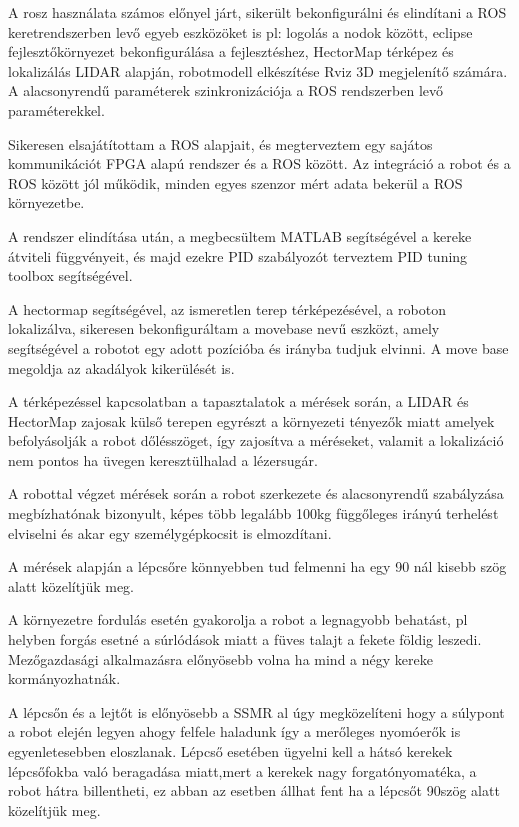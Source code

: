 A rosz használata számos előnyel járt, sikerült bekonfigurálni és elindítani a ROS keretrendszerben levő egyeb eszközöket is pl: logolás a nodok között, eclipse fejlesztőkörnyezet bekonfigurálása a fejlesztéshez, HectorMap térképez és lokalizálás LIDAR alapján, robotmodell elkészítése Rviz 3D megjelenítő számára. A alacsonyrendű paraméterek szinkronizációja a ROS rendszerben levő paraméterekkel.

Sikeresen elsajátítottam a ROS alapjait, és megterveztem egy sajátos kommunikációt FPGA alapú rendszer és a ROS között. Az integráció a robot és a ROS között jól működik, minden egyes szenzor mért adata bekerül a ROS környezetbe.

A rendszer elindítása után, a megbecsültem MATLAB segítségével a kereke átviteli függvényeit, és majd ezekre PID szabályozót terveztem PID tuning toolbox segítségével.

A hectormap segítségével, az ismeretlen terep térképezésével, a roboton lokalizálva, sikeresen bekonfiguráltam a movebase nevű eszközt, amely segítségével a robotot egy adott pozícióba és irányba tudjuk elvinni. A move base megoldja az akadályok kikerülését is.

A térképezéssel kapcsolatban a tapasztalatok a mérések során, a LIDAR és HectorMap zajosak külső terepen egyrészt a környezeti tényezők miatt amelyek befolyásolják a robot dőlésszöget, így zajosítva a méréseket, valamit a lokalizáció nem pontos ha üvegen keresztülhalad a lézersugár.

A robottal végzet mérések során a robot szerkezete és alacsonyrendű szabályzása megbízhatónak bizonyult, képes több legalább 100kg függőleges irányú terhelést elviselni és akar egy személygépkocsit is elmozdítani.

A mérések alapján a lépcsőre könnyebben tud felmenni ha egy 90 \degree nál kisebb szög alatt közelítjük meg.

A környezetre fordulás esetén gyakorolja a robot a legnagyobb behatást, pl helyben forgás esetné a súrlódások miatt a füves talajt a fekete földig leszedi. Mezőgazdasági alkalmazásra előnyösebb volna ha mind a négy kereke kormányozhatnák.

A lépcsőn és a lejtőt is előnyösebb a SSMR al úgy megközelíteni hogy a súlypont a robot elején legyen ahogy felfele haladunk így a merőleges nyomóerők is egyenletesebben eloszlanak. Lépcső esetében ügyelni kell a hátsó kerekek lépcsőfokba való beragadása miatt,mert a kerekek nagy forgatónyomatéka, a robot hátra billentheti, ez abban az esetben állhat fent ha a lépcsőt 90\degree szög alatt közelítjük meg.


